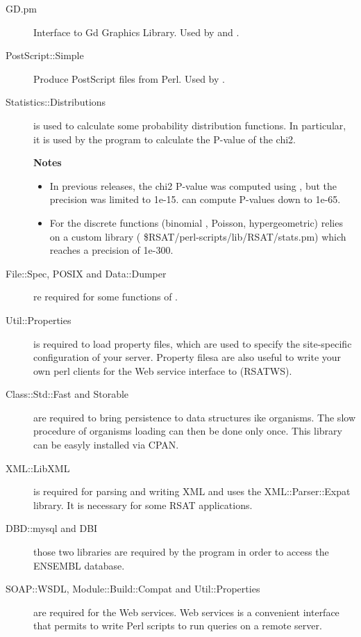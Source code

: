 \documentclass[12pt,a4paper, oneside]{scrreprt} %
\begin{document}
\begin{description}
\item[GD.pm] Interface to Gd Graphics Library. Used by
   and .

\item[PostScript::Simple] Produce PostScript files from Perl. Used by
  .

\item[Statistics::Distributions] is used to calculate some probability
  distribution functions. In particular, it is used by the program
   to calculate the P-value of the
  chi2. 

  \textbf{Notes} 
  \begin{itemize}
  \item In previous releases, the chi2 P-value was computed using
    , but the precision was limited to
    1e-15.  can compute P-values
    down to 1e-65.
  \item For the discrete functions (binomial , Poisson,
    hypergeometric) \RSAT relies on a custom library (
    \$RSAT/perl-scripts/lib/RSAT/stats.pm) which reaches a precision
    of 1e-300.
  \end{itemize}

\item[File::Spec, POSIX and Data::Dumper] re required for some
  functions of .

\item[Util::Properties] is required to load property files, which are
  used to specify the site-specific configuration of your \RSAT
  server. Property filesa are also useful to write your own perl
  clients for the Web service interface to \RSAT (RSATWS).

\item[Class::Std::Fast and Storable] are required to bring persistence
  to data structures ike organisms. The slow procedure of organisms
  loading can then be done only once. This library can be easyly
  installed via CPAN.

\item[XML::LibXML] is required for parsing and writing XML and uses
  the XML::Parser::Expat library. It is necessary for some RSAT
  applications.

\item[DBD::mysql and DBI] those two libraries are required by the
  program  in order to access the
  ENSEMBL database.

\item[SOAP::WSDL, Module::Build::Compat and Util::Properties] are
  required for the Web services. \RSAT Web services is a convenient
  interface that permits to write Perl scripts to run \RSAT queries on
  a remote server.

\end{description}
\end{document}
